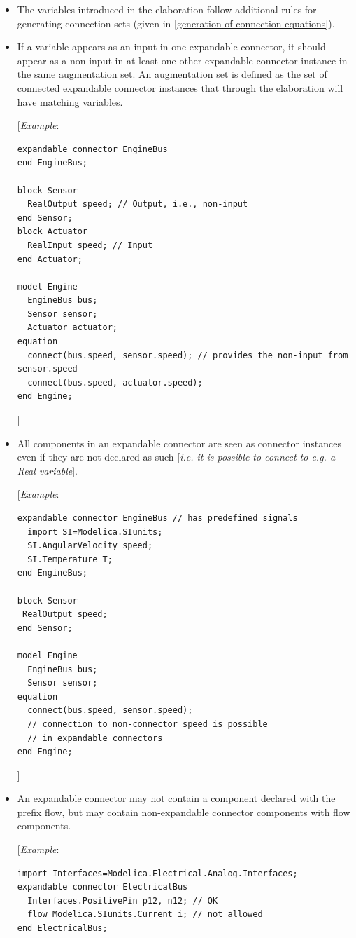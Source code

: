 \documentclass[10pt,a4paper]{report}
\begin{document}
\begin{itemize}
\item
  The variables introduced in the elaboration follow additional rules
  for generating connection sets (given in \ref{generation-of-connection-equations}).
\item
  If a variable appears as an input in one expandable connector, it
  should appear as a non-input in at least one other expandable
  connector instance in the same augmentation set. An augmentation set
  is defined as the set of connected expandable connector instances that
  through the elaboration will have matching variables.

{[}\emph{Example}:
\begin{lstlisting}[language=modelica]
expandable connector EngineBus
end EngineBus;

block Sensor
  RealOutput speed; // Output, i.e., non-input
end Sensor;
block Actuator
  RealInput speed; // Input
end Actuator;

model Engine
  EngineBus bus;
  Sensor sensor;
  Actuator actuator;
equation
  connect(bus.speed, sensor.speed); // provides the non-input from sensor.speed
  connect(bus.speed, actuator.speed);
end Engine;
\end{lstlisting}
{]}

\item
  All components in an expandable connector are seen as connector
  instances even if they are not declared as such {[}\emph{i.e. it is
  possible to connect to e.g. a Real variable}{]}.

{[}\emph{Example}:
\begin{lstlisting}[language=modelica]
expandable connector EngineBus // has predefined signals
  import SI=Modelica.SIunits;
  SI.AngularVelocity speed;
  SI.Temperature T;
end EngineBus;

block Sensor
 RealOutput speed;
end Sensor;

model Engine
  EngineBus bus;
  Sensor sensor;
equation
  connect(bus.speed, sensor.speed);
  // connection to non-connector speed is possible
  // in expandable connectors
end Engine;
\end{lstlisting}
{]}

\item
  An expandable connector may not contain a component declared with the
  prefix flow, but may contain non-expandable connector components with
  flow components.

{[}\emph{Example}:
\begin{lstlisting}[language=modelica]
import Interfaces=Modelica.Electrical.Analog.Interfaces;
expandable connector ElectricalBus
  Interfaces.PositivePin p12, n12; // OK
  flow Modelica.SIunits.Current i; // not allowed
end ElectricalBus;


\end{lstlisting}
\end{itemize}
\end{document}
